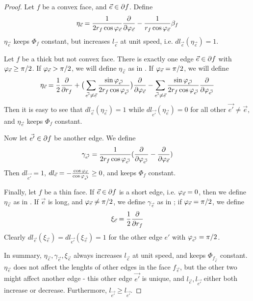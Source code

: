 \begin{proof}
Let $f$ be a convex face, and $\vec{e} \in \partial f$. Define
\begin{equation}
\label{e:eta_e}
\eta_{\vec{e}} =
\frac{1}{2 r_f \cos \varphi_{\vec{e}}} {\frac{\partial}{\partial \varphi_{\vec{e}}}}
- \frac{1}{r_f \cos \varphi_{\vec{e}}} \beta_f
\end{equation}
$\eta_{\vec{e}}$ keeps $\Phi_f$ constant, but increases $l_{\vec{e}}$
at unit speed, i.e. $dl_{\vec{e}}(\eta_{\vec{e}}) = 1$.


Let $f$ be a thick but not convex face.
There is exactly one edge $\vec{e} \in \partial f$
with $\varphi_{\vec{e}} \geq \pi/2$.
If $\varphi_{\vec{e}} > \pi/2$, we will define
$\eta_{\vec{e}}$ as in .
If $\varphi_{\vec{e}} = \pi/2$,
we will define
\begin{equation}
\label{e:eta_e_2}
\eta_{\vec{e}} = \frac{1}{2}{\frac{\partial}{\partial r_f}}
+ \big(\sum_{\vec{e'} \neq \vec{e}}
	\frac{\sin \varphi_{\vec{e'}}}{2 r_f \cos \varphi_{\vec{e'}}}\big)
	{\frac{\partial}{\partial \varphi_{\vec{e}}}}
- \sum_{\vec{e'} \neq \vec{e}}
	\frac{\sin \varphi_{\vec{e'}}}{2 r_f \cos \varphi_{\vec{e'}}}
	{\frac{\partial}{\partial \varphi_{\vec{e'}}}}
\end{equation}
Then it is easy to see that
$dl_{\vec{e}}(\eta_{\vec{e}}) = 1$
while
$dl_{\vec{e'}}(\eta_{\vec{e}}) = 0$
for all other $\vec{e'} \neq \vec{e}$,
and $\eta_{\vec{e}}$ keeps $\Phi_f$ constant.


Now let $\vec{e'} \in \partial f$ be another edge.
We define
\begin{equation}
\label{e:gamma_e}
\gamma_{\vec{e'}} = \frac{1}{2 r_f \cos{\varphi_{\vec{e'}}}}
	({\frac{\partial}{\partial \varphi_{\vec{e'}}}} - {\frac{\partial}{\partial \varphi_{\vec{e}}}})
\end{equation}
Then $dl_{\vec{e'}} = 1$,
$dl_{\vec{e}} = -\frac{\cos \varphi_{\vec{e}}}{\cos \varphi_{\vec{e'}}} \geq 0$,
and keeps $\Phi_f$ constant.


Finally, let $f$ be a thin face.
If $\vec{e} \in \partial f$ is a short edge,
i.e. $\varphi_{\vec{e}} = 0$,
then we define $\eta_{\vec{e}}$ as in .
If $\vec{e}$ is long, and $\varphi_{\vec{e}} \neq \pi/2$,
we define $\gamma_{\vec{e}}$ as in ;
if $\varphi_{\vec{e}} = \pi/2$, we define
\begin{equation}
\label{e:xi_e}
\xi_{\vec{e}} = \frac{1}{2}{\frac{\partial}{\partial r_f}}
\end{equation}
Clearly $dl_{\vec{e}}(\xi_{\vec{e}}) = dl_{\vec{e'}}(\xi_{\vec{e}}) = 1$
for the other edge $e'$ with $\varphi_{\vec{e'}} = \pi/2$.


In summary,
$\eta_{\vec{e}}, \gamma_{\vec{e}}, \xi_{\vec{e}}$
always increases $l_{\vec{e}}$ at unit speed,
and keeps $\Phi_{f_{\vec{e}}}$ constant.
$\eta_{\vec{e}}$ does not affect the lenghts of other edges
in the face $f_{\vec{e}}$,
but the other two might affect another edge
- this other edge $\vec{e'}$ is unique,
and $l_{\vec{e}}, l_{\vec{e'}}$ either both increase
or decrease.
Furthermore, $l_{\vec{e'}} \geq l_{\vec{e'}}$.



\end{proof}
